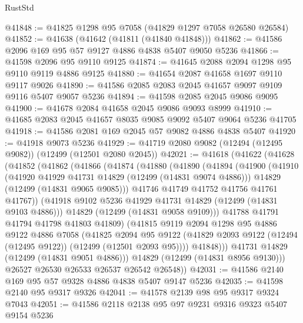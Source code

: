 \begin{lexlean}{RustStd}
\begin{coremodule}
{\begin{coremodule}
{{{{{{{{{{{{{{{{{{{{{{{{{{{{{{{{{{{{{{{{{{{{{{{{{{{{{{{{{{{{{{{{{{{{{{{{{{{{{{{{@41848 := @41825 @1298 @95 @7058 (@41829 @1297 @7058 @26580 @26584)
@41852 := @41638 (@41642 (@41811 (@41840 @41848)))
@41862 := @41586 @2096 @169 @95 @57 @9127 @4886 @4838 @5407 @9050 @5236
@41866 := @41598 @2096 @95 @9110 @9125
@41874 := @41645 @2088 @2094 @1298 @95 @9110 @9119 @4886 @9125
@41880 := @41654 @2087 @41658 @1697 @9110 @9117 @9026
@41890 := @41586 @2085 @2083 @2045 @41657 @9097 @9109 @9116 @5407 @9057 @5236
@41894 := @41598 @2085 @2045 @9086 @9095
@41900 := @41678 @2084 @41658 @2045 @9086 @9093 @8999
@41910 := @41685 @2083 @2045 @41657 @8035 @9085 @9092 @5407 @9064 @5236 @41705
@41918 := @41586 @2081 @169 @2045 @57 @9082 @4886 @4838 @5407
@41920 := @41918 @9073 @5236
@41929 := @41719 @2080 @9082 (@12494 (@12495 @9082)) (@12499 (@12501 @2080 @2045))
@42021 := @41618
    (@41622
      (@41628
        (@41852
          (@41862
            (@41866
              (@41874
                (@41880
                  (@41890
                    (@41894
                      (@41900
                        (@41910
                          (@41920 @41929 @41731 @14829 (@12499 (@14831 @9074 @4886)))
                          @14829
                          (@12499 (@14831 @9065 @9085)))
                        @41746
                        @41749
                        @41752
                        @41756
                        @41761
                        @41767))
                    (@41918 @9102 @5236 @41929 @41731 @14829 (@12499 (@14831 @9103 @4886)))
                    @14829
                    (@12499 (@14831 @9058 @9109)))
                  @41788
                  @41791
                  @41794
                  @41798
                  @41803
                  @41809)
                (@41815
                  @9119
                  @2094
                  @1298
                  @95
                  @4886
                  @9122
                  @4886
                  @7058
                  (@41825
                    @2094
                    @95
                    @9122
                    (@41829 @2093 @9122 (@12494 (@12495 @9122)) (@12499 (@12501 @2093 @95))))
                  @41848)))
            @41731
            @14829
            (@12499 (@14831 @9051 @4886)))
          @14829
          (@12499 (@14831 @8956 @9130)))
        @26527
        @26530
        @26533
        @26537
        @26542
        @26548))
@42031 := @41586 @2140 @169 @95 @57 @9328 @4886 @4838 @5407 @9147 @5236
@42035 := @41598 @2140 @95 @9317 @9326
@42041 := @41578 @2139 @98 @95 @9317 @9324 @7043
@42051 := @41586 @2118 @2138 @95 @97 @9231 @9316 @9323 @5407 @9154 @5236
}}}}}}}}}}}}}}}}}}}}}}}}}}}}}}}}}}}}}}}}}}}}}}}}}}}}}}}}}}}}}}}}}}}}}}}}}}}}}}}}
\end{coremodule}}
\end{coremodule}
\end{lexlean}
